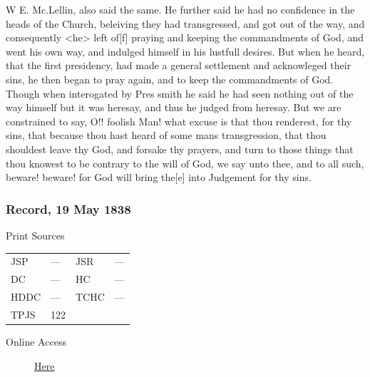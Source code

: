 					W E. Mc.Lellin, also said the same. He further said he had no confidence in the heads of the Church, beleiving they had transgressed, and got out of the way, and consequently <he> left of[f] praying and keeping the commandments of God, and went his own way, and indulged himself in his lustfull desires. But when he heard, that the first presidency, had made a general settlement and acknowleged their sins, he then began to pray again, and to keep the commandments of God. Though when interogated by Pres smith he said he had seen nothing out of the way himself but it was heresay, and thus he judged from heresay. But we are constrained to say, O!! foolish Man! what excuse is that thou renderest, for thy sins, that because thou hast heard of some mans transgression, that thou shouldest leave thy God, and forsake thy prayers, and turn to those things that thou knowest to be contrary to the will of God, we say unto thee, and to all such, beware! beware! for God will bring the[e] into Judgement for thy sins.
					
		\subsubsection{Record, 19 May 1838}
			\label{EMS-1838-JS-19-MAY-1838}
			
			\begin{description}
					\item[Print Sources]
				\end{description}

					\begin{tabular}{p{0.5in}p{1in}p{0.5in}p{1in}}
					JSP	 	& ---				& JSR 		& --- \\
					DC	 	& ---				& HC 		& --- \\
					HDDC 	& ---				& TCHC 		& --- \\
					TPJS 	& 122				&  &  \\
					\end{tabular}
				
				\begin{description}
					\item[Online Access] \href{https://www.josephsmithpapers.org/paper-summary/journal-march-september-1838/29}{Here}
				\end{description}
				

